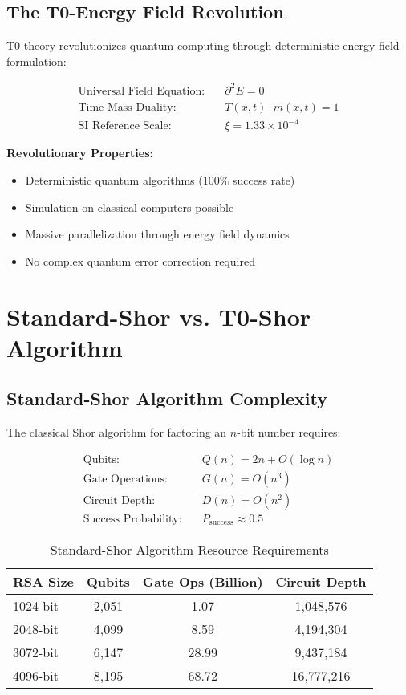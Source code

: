 \documentclass[12pt,a4paper]{article}
\newcommand{\Efield}{E}
\newcommand{\xipar}{\xi}
\newcommand{\Tfield}{T}
\newcommand{\mfield}{m}
\begin{document}
	\subsection{The T0-Energy Field Revolution}
	
	T0-theory revolutionizes quantum computing through deterministic energy field formulation:
	
	\begin{align}
		\text{Universal Field Equation}: \quad &\partial^2 \Efield = 0 \\
		\text{Time-Mass Duality}: \quad &\Tfield(x,t) \cdot \mfield(x,t) = 1 \\
		\text{SI Reference Scale}: \quad &\xipar = 1.33 \times 10^{-4}
	\end{align}
	
	\textbf{Revolutionary Properties}:
	\begin{itemize}
		\item Deterministic quantum algorithms (100\% success rate)
		\item Simulation on classical computers possible
		\item Massive parallelization through energy field dynamics
		\item No complex quantum error correction required
	\end{itemize}
	
	\section{Standard-Shor vs. T0-Shor Algorithm}
	
	\subsection{Standard-Shor Algorithm Complexity}
	
	The classical Shor algorithm for factoring an $n$-bit number requires:
	
	\begin{align}
		\text{Qubits}: \quad &Q(n) = 2n + O(\log n) \\
		\text{Gate Operations}: \quad &G(n) = O(n^3) \\
		\text{Circuit Depth}: \quad &D(n) = O(n^2) \\
		\text{Success Probability}: \quad &P_{\text{success}} \approx 0.5
	\end{align}
	
	\begin{table}[htbp]
		\centering
		\begin{tabular}{lccc}
			\toprule
			\textbf{RSA Size} & \textbf{Qubits} & \textbf{Gate Ops (Billion)} & \textbf{Circuit Depth} \\
			\midrule
			1024-bit & 2,051 & 1.07 & 1,048,576 \\
			2048-bit & 4,099 & 8.59 & 4,194,304 \\
			3072-bit & 6,147 & 28.99 & 9,437,184 \\
			4096-bit & 8,195 & 68.72 & 16,777,216 \\
			\bottomrule
		\end{tabular}
		\caption{Standard-Shor Algorithm Resource Requirements}
		\label{tab:standard_shor}
	\end{table}
	
\end{document}
